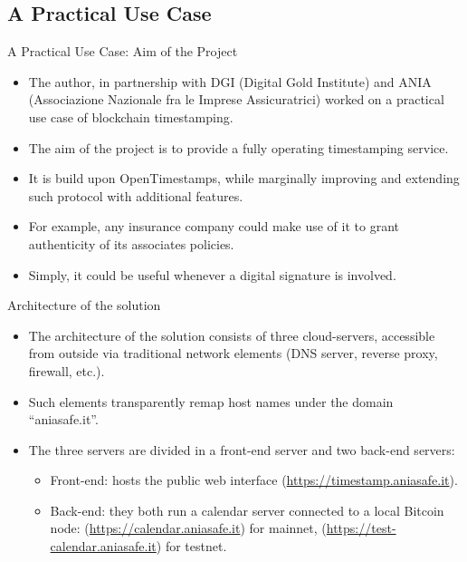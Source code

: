 \documentclass[usenames,dvipsnames]{beamer}
\begin{document}
    \subsection{A Practical Use Case}
    
    \begin{frame}{A Practical Use Case: Aim of the Project }
        \begin{itemize}
            \item The author, in partnership with \alert{DGI} (Digital Gold Institute) and \alert{ANIA} (Associazione Nazionale fra le Imprese Assicuratrici) worked on a \alert{practical use case} of blockchain timestamping.
            \item The aim of the project is to provide a fully operating \alert{timestamping service}.
            \item It is build upon OpenTimestamps, while marginally \alert{improving} and \alert{extending} such protocol with additional features.
            \item For example, any insurance company could make use of it to grant \alert{authenticity} of its associates policies.
            \item Simply, it could be useful whenever a \alert{digital signature} is involved.
        \end{itemize}
    \end{frame}
    
    \begin{frame}{Architecture of the solution}
        \begin{itemize}
            \item The \alert{architecture} of the solution consists of \alert{three cloud-servers}, accessible from outside via traditional network elements (DNS server, reverse proxy, firewall, etc.).
            \item Such elements transparently remap host names under the domain \textquotedblleft aniasafe.it\textquotedblright.
            \item The three servers are divided in a \alert{front-end} server and two \alert{back-end} servers:
            \begin{itemize}
                \item \alert{Front-end}: hosts the public \alert{web interface} (\url{https://timestamp.aniasafe.it}). 
                \item \alert{Back-end}: they both run a \alert{calendar server} connected to a local Bitcoin node: (\url{https://calendar.aniasafe.it}) for mainnet, (\url{https://test-calendar.aniasafe.it}) for testnet.
            \end{itemize}
        \end{itemize}
    \end{frame}
    
\end{document}
